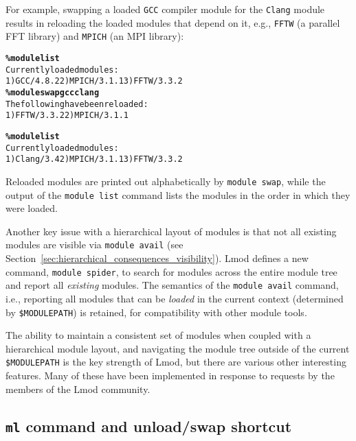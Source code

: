 For example, swapping a loaded \texttt{\small GCC} compiler module for the
\texttt{\small {Clang}} module results in reloading the loaded modules that
depend on it, e.g., \texttt{\small FFTW} (a parallel FFT library) and
\texttt{\small MPICH} (an MPI library):
{\small
  \begin{alltt}
    \textbf{\% module list}
    Currently loaded modules:
    1) GCC/4.8.2  2) MPICH/3.1.1  3) FFTW/3.3.2
    \textbf{\% module swap gcc clang}
    The following have been reloaded:
    1) FFTW/3.3.2  2) MPICH/3.1.1
\end{alltt}}
{\small\begin{alltt}
    \textbf{\% module list}
    Currently loaded modules:
    1) Clang/3.4  2) MPICH/3.1.1  3) FFTW/3.3.2
\end{alltt}
}
\noindent
Reloaded modules are printed out
alphabetically by \texttt{\small module swap}, while the output of
the \texttt{\small module list} command lists the modules in the order in which
they were loaded.


Another key issue with a hierarchical layout of modules is that not all
existing modules are visible via \texttt{\small module avail} (see
Section~\ref{sec:hierarchical_consequences_visibility}). Lmod defines a
new command, \texttt{\small module spider}, to search for modules across the
entire module tree and report all \emph{existing} modules. The semantics of
the \texttt{\small module avail} command, i.e., reporting all modules that can
be \emph{loaded} in the current context (determined by
\texttt{\small \$MODULEPATH}) is retained, for compatibility with other module
tools.

The ability to maintain a consistent set of modules when coupled with a
hierarchical module layout, and navigating the module tree outside of the
current \texttt{\small \$MODULEPATH} is the key strength of Lmod, but there are
various other interesting features.  Many of these have been implemented in
response to requests by the members of the Lmod community.

\subsection{\texttt{\small ml} command and unload/swap shortcut}

